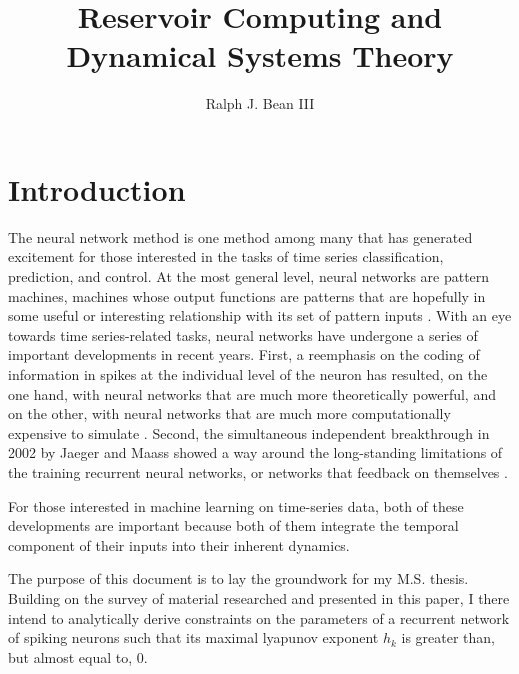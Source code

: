 \documentclass{elsart1p}
\begin{document}
\begin{frontmatter}

\title{Reservoir Computing and Dynamical Systems Theory}

\author{Ralph J. Bean III}

\end{frontmatter}

\section{Introduction}

The neural network method is one method among many that has generated
excitement for those interested in the tasks of time series
classification, prediction, and control.
At the most general level, neural networks are pattern machines,
machines whose output functions are patterns that are hopefully in some
useful or interesting relationship with its set of pattern inputs
\cite{weigend}.
With an eye towards time series-related tasks, neural networks have
undergone a series of important developments in recent years.
First, a reemphasis on the coding of information in spikes at the
individual level of the neuron has resulted, on the one hand, with neural
networks that are much more theoretically powerful, and on the other, with
neural networks that are much more computationally expensive to simulate 
\cite{maass_book}.  Second, the simultaneous independent breakthrough in 2002 by
Jaeger and Maass showed a way around the long-standing limitations
of the training recurrent neural networks, or networks that feedback on
themselves \cite{maass_original, jaeger_original, doya}.

For those interested in machine learning on time-series data, both of
these developments are important because both of them integrate the
temporal component of their inputs into their inherent dynamics.

The purpose of this document is to lay the groundwork for my M.S. thesis.
Building on the survey of material researched and presented in this paper,
I there intend to analytically derive constraints on the parameters of a
recurrent network of spiking neurons such that its maximal lyapunov exponent 
$h_{k}$ is greater than, but almost equal to, $0$.


\end{document}
